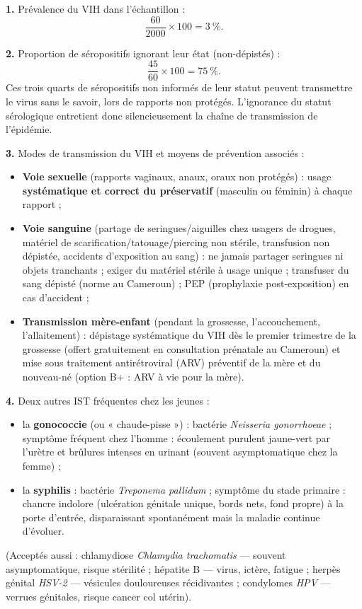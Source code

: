 \documentclass[11pt]{article}
\begin{document}
\begin{corrige}

\textbf{1.} Prévalence du VIH dans l'échantillon :
\[
\frac{60}{\num{2000}}\times 100 = 3\ \%.
\]

\textbf{2.} Proportion de séropositifs ignorant leur état (non-dépistés) :
\[
\frac{45}{60}\times 100 = 75\ \%.
\]
Ces trois quarts de séropositifs non informés de leur statut peuvent transmettre le virus sans le savoir, lors de rapports non protégés. L'ignorance du statut sérologique entretient donc silencieusement la chaîne de transmission de l'épidémie.

\textbf{3.} Modes de transmission du VIH et moyens de prévention associés :
\begin{itemize}
\item \textbf{Voie sexuelle} (rapports vaginaux, anaux, oraux non protégés) : usage \textbf{systématique et correct du préservatif} (masculin ou féminin) à chaque rapport ;
\item \textbf{Voie sanguine} (partage de seringues/aiguilles chez usagers de drogues, matériel de scarification/tatouage/piercing non stérile, transfusion non dépistée, accidents d'exposition au sang) : ne jamais partager seringues ni objets tranchants ; exiger du matériel stérile à usage unique ; transfuser du sang dépisté (norme au Cameroun) ; PEP (prophylaxie post-exposition) en cas d'accident ;
\item \textbf{Transmission mère-enfant} (pendant la grossesse, l'accouchement, l'allaitement) : dépistage systématique du VIH dès le premier trimestre de la grossesse (offert gratuitement en consultation prénatale au Cameroun) et mise sous traitement antirétroviral (ARV) préventif de la mère et du nouveau-né (option B+ : ARV à vie pour la mère).
\end{itemize}

\textbf{4.} Deux autres IST fréquentes chez les jeunes :
\begin{itemize}
\item la \textbf{gonococcie} (ou « chaude-pisse ») : bactérie \emph{Neisseria gonorrhoeae} ; symptôme fréquent chez l'homme : écoulement purulent jaune-vert par l'urètre et brûlures intenses en urinant (souvent asymptomatique chez la femme) ;
\item la \textbf{syphilis} : bactérie \emph{Treponema pallidum} ; symptôme du stade primaire : chancre indolore (ulcération génitale unique, bords nets, fond propre) à la porte d'entrée, disparaissant spontanément mais la maladie continue d'évoluer.
\end{itemize}
(Acceptés aussi : chlamydiose \emph{Chlamydia trachomatis} — souvent asymptomatique, risque stérilité ; hépatite B — virus, ictère, fatigue ; herpès génital \emph{HSV-2} — vésicules douloureuses récidivantes ; condylomes \emph{HPV} — verrues génitales, risque cancer col utérin).


\end{corrige}
\end{document}
